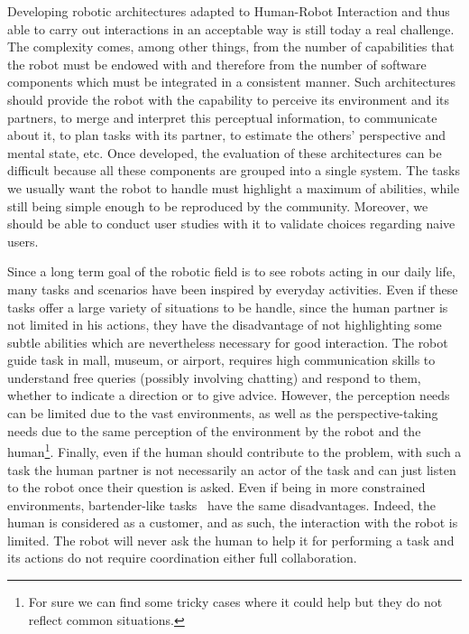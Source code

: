 Developing robotic architectures adapted to Human-Robot Interaction and thus able to carry out interactions in an acceptable way is still today a real challenge. The complexity comes, among other things, from the number of capabilities that the robot must be endowed with and therefore from the number of software components which must be integrated in a consistent manner. Such architectures should provide the robot with the capability to perceive its environment and its partners, to merge and interpret this perceptual information, to communicate about it, to plan tasks with its partner, to estimate the others' perspective and mental state, etc. Once developed, the evaluation of these architectures can be difficult because all these components are grouped into a single system. The tasks we usually want the robot to handle must highlight a maximum of abilities, while still being simple enough to be reproduced by the community. Moreover, we should be able to conduct user studies with it to validate choices regarding naive users.

Since a long term goal of the robotic field is to see robots acting in our daily life, many tasks and scenarios have been inspired by everyday activities. Even if these tasks offer a large variety of situations to be handle, since the human partner is not limited in his actions, they have the disadvantage of not highlighting some subtle abilities which are nevertheless necessary for good interaction.
The robot guide task \cite{satake_2015_should} in mall, museum, or airport, requires high communication skills to understand free queries (possibly involving chatting) and respond to them, whether to indicate a direction or to give advice. However, the perception needs can be limited due to the vast environments, as well as the perspective-taking needs due to the same perception of the environment by the robot and the human\footnote{For sure we can find some tricky cases where it could help but they do not reflect common situations.}. Finally, even if the human should contribute to the problem, with such a task the human partner is not necessarily an actor of the task and can just listen to the robot once their question is asked. Even if being in more constrained environments, bartender-like tasks~\cite{petrick_2012_social} have the same disadvantages. Indeed, the human is considered as a customer, and as such, the interaction with the robot is limited. The robot will never ask the human to help it for performing a task and its actions do not require coordination either full collaboration.

